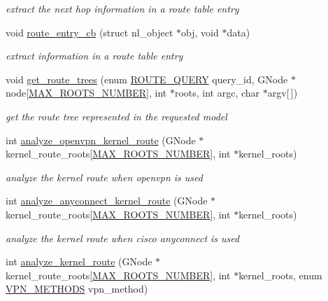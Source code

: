 \begin{DoxyCompactItemize}
\begin{DoxyCompactList}\small\item\em extract the next hop information in a route table entry \end{DoxyCompactList}\item 
void \hyperlink{route-tree_8c_a112b373b8e4a4a0eacfba3cc078e5ce2}{route\+\_\+entry\+\_\+cb} (struct nl\+\_\+object $\ast$obj, void $\ast$data)
\begin{DoxyCompactList}\small\item\em extract information in a route table entry \end{DoxyCompactList}\item 
void \hyperlink{route-tree_8c_a7e256826bca6c828a8564f27f84dd517}{get\+\_\+route\+\_\+trees} (enum \hyperlink{route-tree_8c_aed8cdbb52dbe32c343a8c26887888e7f}{R\+O\+U\+T\+E\+\_\+\+Q\+U\+E\+RY} query\+\_\+id, G\+Node $\ast$node\mbox{[}\hyperlink{route-tree_8h_a8e1da3af3417de420798c8b448b6a8cb}{M\+A\+X\+\_\+\+R\+O\+O\+T\+S\+\_\+\+N\+U\+M\+B\+ER}\mbox{]}, int $\ast$roots, int argc, char $\ast$argv\mbox{[}$\,$\mbox{]})
\begin{DoxyCompactList}\small\item\em get the route tree represented in the requested model \end{DoxyCompactList}\item 
int \hyperlink{route-tree_8c_a023982baea4d991af1755c75365e6070}{analyze\+\_\+openvpn\+\_\+kernel\+\_\+route} (G\+Node $\ast$kernel\+\_\+route\+\_\+roots\mbox{[}\hyperlink{route-tree_8h_a8e1da3af3417de420798c8b448b6a8cb}{M\+A\+X\+\_\+\+R\+O\+O\+T\+S\+\_\+\+N\+U\+M\+B\+ER}\mbox{]}, int $\ast$kernel\+\_\+roots)
\begin{DoxyCompactList}\small\item\em analyze the kernel route when openvpn is used \end{DoxyCompactList}\item 
int \hyperlink{route-tree_8c_ad4fe4de0af6177aad9c1936fcaa1d988}{analyze\+\_\+anyconnect\+\_\+kernel\+\_\+route} (G\+Node $\ast$kernel\+\_\+route\+\_\+roots\mbox{[}\hyperlink{route-tree_8h_a8e1da3af3417de420798c8b448b6a8cb}{M\+A\+X\+\_\+\+R\+O\+O\+T\+S\+\_\+\+N\+U\+M\+B\+ER}\mbox{]}, int $\ast$kernel\+\_\+roots)
\begin{DoxyCompactList}\small\item\em analyze the kernel route when cisco anyconnect is used \end{DoxyCompactList}\item 
int \hyperlink{route-tree_8c_a5a490e2e29be18ae630572e3776539af}{analyze\+\_\+kernel\+\_\+route} (G\+Node $\ast$kernel\+\_\+route\+\_\+roots\mbox{[}\hyperlink{route-tree_8h_a8e1da3af3417de420798c8b448b6a8cb}{M\+A\+X\+\_\+\+R\+O\+O\+T\+S\+\_\+\+N\+U\+M\+B\+ER}\mbox{]}, int $\ast$kernel\+\_\+roots, enum \hyperlink{route-tree_8h_a5b876670828c4e38106ba1c6d91024b7}{V\+P\+N\+\_\+\+M\+E\+T\+H\+O\+DS} vpn\+\_\+method)

\end{DoxyCompactItemize}
